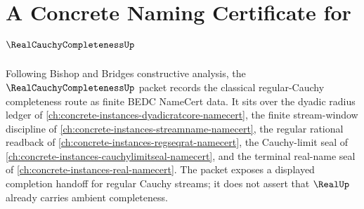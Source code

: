 \chapter{A Concrete Naming Certificate for $\RealCauchyCompletenessUp$}
\label{ch:concrete-instances-real-cauchy-completeness-namecert}

Following Bishop and Bridges constructive analysis, the $\RealCauchyCompletenessUp$ packet records the classical regular-Cauchy completeness route as finite BEDC NameCert data. It sits over the dyadic radius ledger of \autoref{ch:concrete-instances-dyadicratcore-namecert}, the finite stream-window discipline of \autoref{ch:concrete-instances-streamname-namecert}, the regular rational readback of \autoref{ch:concrete-instances-regseqrat-namecert}, the Cauchy-limit seal of \autoref{ch:concrete-instances-cauchylimitseal-namecert}, and the terminal real-name seal of \autoref{ch:concrete-instances-real-namecert}. The packet exposes a displayed completion handoff for regular Cauchy streams; it does not assert that $\RealUp$ already carries ambient completeness.

